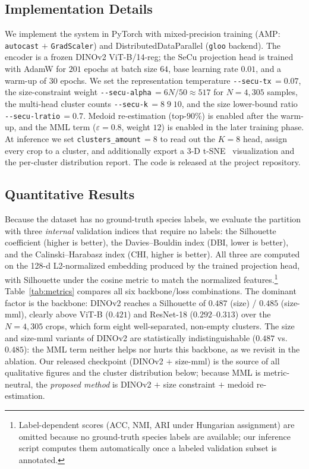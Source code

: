 \documentclass[10pt,a4paper,twocolumn]{article}
\begin{document}
\subsection{Implementation Details}
We implement the system in PyTorch with mixed-precision training (AMP: \texttt{autocast} $+$ \texttt{GradScaler}) and DistributedDataParallel (\texttt{gloo} backend). The encoder is a frozen DINOv2 ViT-B/14-reg; the SeCu projection head is trained with AdamW for $201$ epochs at batch size $64$, base learning rate $0.01$, and a warm-up of $30$ epochs. We set the representation temperature \texttt{-{}-secu-tx}\,$=\!0.07$, the size-constraint weight \texttt{-{}-secu-alpha}\,$=\!6N/50\!\approx\!517$ for $N\!=\!4{,}305$ samples, the multi-head cluster counts \texttt{-{}-secu-k}\,$=\!8\;9\;10$, and the size lower-bound ratio \texttt{-{}-secu-lratio}\,$=\!0.7$. Medoid re-estimation (top-$90\%$) is enabled after the warm-up, and the MML term ($\varepsilon\!=\!0.8$, weight $12$) is enabled in the later training phase. At inference we set \texttt{clusters\_amount}\,$=\!8$ to read out the $K\!=\!8$ head, assign every crop to a cluster, and additionally export a 3-D t-SNE~\cite{vandermaaten2008tsne} visualization and the per-cluster distribution report. The code is released at the project repository.

\subsection{Quantitative Results}
Because the dataset has no ground-truth species labels, we evaluate the partition with three \emph{internal} validation indices that require no labels: the Silhouette coefficient (higher is better), the Davies--Bouldin index (DBI, lower is better), and the Calinski--Harabasz index (CHI, higher is better). All three are computed on the 128-d L2-normalized embedding produced by the trained projection head, with Silhouette under the cosine metric to match the normalized features.\footnote{Label-dependent scores (ACC, NMI, ARI under Hungarian assignment) are omitted because no ground-truth species labels are available; our inference script computes them automatically once a labeled validation subset is annotated.} Table~\ref{tab:metrics} compares all six backbone/loss combinations. The dominant factor is the backbone: DINOv2 reaches a Silhouette of $0.487$ (size) / $0.485$ (size-mml), clearly above ViT-B ($0.421$) and ResNet-18 ($0.292$--$0.313$) over the $N\!=\!4{,}305$ crops, which form eight well-separated, non-empty clusters. The size and size-mml variants of DINOv2 are statistically indistinguishable ($0.487$ vs.\ $0.485$): the MML term neither helps nor hurts this backbone, as we revisit in the ablation. Our released checkpoint (DINOv2 $+$ size-mml) is the source of all qualitative figures and the cluster distribution below; because MML is metric-neutral, the \emph{proposed method} is DINOv2 $+$ size constraint $+$ medoid re-estimation.
\end{document}
